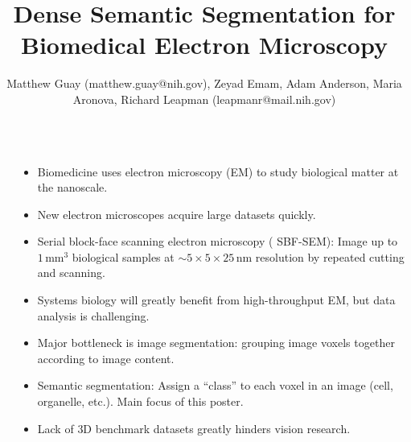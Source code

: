 \documentclass[final]{beamer}
\title{Dense Semantic Segmentation for Biomedical Electron Microscopy} %
\author{{Matthew Guay (matthew.guay@nih.gov),} {Zeyad Emam,} {Adam Anderson,} {Maria Aronova,} {Richard Leapman (leapmanr@mail.nih.gov)}}%
\institute{\textbf{Laboratory of Cellular Imaging and Macromolecular Biophysics, NIBIB, NIH}} %
\newlength{\sepwid}
\newlength{\onecolwid}
\renewcommand{\emph}[1]{{\color{nibib2} #1}}
\begin{document}
\begin{frame}[t] %

\begin{columns}[t] %

\begin{column}{\sepwid}\end{column} %


\begin{column}{\onecolwid}

    \begin{tcolorbox}[title=Introduction]
        \begin{itemize}
            \item Biomedicine uses \emph{electron microscopy} (EM) to study biological matter at the nanoscale.
            \item New electron microscopes acquire large datasets quickly.
            \item Serial block-face scanning electron microscopy (\emph{SBF-SEM}): Image up to $1\,\text{mm}^3$ biological samples at $\sim 5\times 5\times 25\,\text{nm}$ resolution by repeated cutting and scanning.
            \item \emph{Systems biology} will greatly benefit from high-throughput EM, but data analysis is challenging.
            
            \item Major bottleneck is \emph{image segmentation}: grouping image voxels together according to image content.
            \item \emph{Semantic} segmentation: Assign a ``class'' to each voxel in an image (cell, organelle, etc.). Main focus of this poster.
            \item Lack of \emph{3D benchmark datasets} greatly hinders vision research.  %
            
        \end{itemize}
    \end{tcolorbox}
    

\end{column}
\end{columns}
\end{frame}
\end{document}
